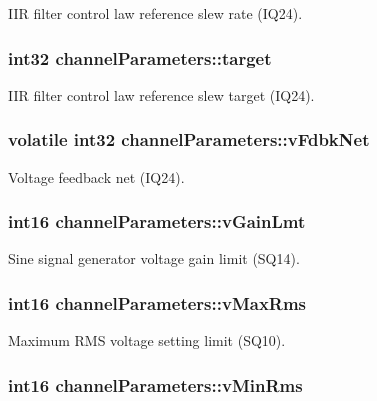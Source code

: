 I\-I\-R filter control law reference slew rate (I\-Q24). \hypertarget{a00003_a2d9b0f07810affea40c8502613b8984e}{
\subsubsection[{target}]{\setlength{\rightskip}{0pt plus 5cm}int32 channel\-Parameters\-::target}}\label{a00003_a2d9b0f07810affea40c8502613b8984e}
I\-I\-R filter control law reference slew target (I\-Q24). \hypertarget{a00003_a5b3f0afc0e3ef0bc0726ee695570e787}{
\subsubsection[{v\-Fdbk\-Net}]{\setlength{\rightskip}{0pt plus 5cm}volatile int32 channel\-Parameters\-::v\-Fdbk\-Net}}\label{a00003_a5b3f0afc0e3ef0bc0726ee695570e787}
Voltage feedback net (I\-Q24). \hypertarget{a00003_a7dd5ddd959b3f3344721e729e51f0db5}{
\subsubsection[{v\-Gain\-Lmt}]{\setlength{\rightskip}{0pt plus 5cm}int16 channel\-Parameters\-::v\-Gain\-Lmt}}\label{a00003_a7dd5ddd959b3f3344721e729e51f0db5}
Sine signal generator voltage gain limit (S\-Q14). \hypertarget{a00003_a21e56dc9f903bbea9c980648a8ffc097}{
\subsubsection[{v\-Max\-Rms}]{\setlength{\rightskip}{0pt plus 5cm}int16 channel\-Parameters\-::v\-Max\-Rms}}\label{a00003_a21e56dc9f903bbea9c980648a8ffc097}
Maximum R\-M\-S voltage setting limit (S\-Q10). \hypertarget{a00003_af6a4d30899a436a77b24b99baa2852f6}{
\subsubsection[{v\-Min\-Rms}]{\setlength{\rightskip}{0pt plus 5cm}int16 channel\-Parameters\-::v\-Min\-Rms}}\label{a00003_af6a4d30899a436a77b24b99baa2852f6}
